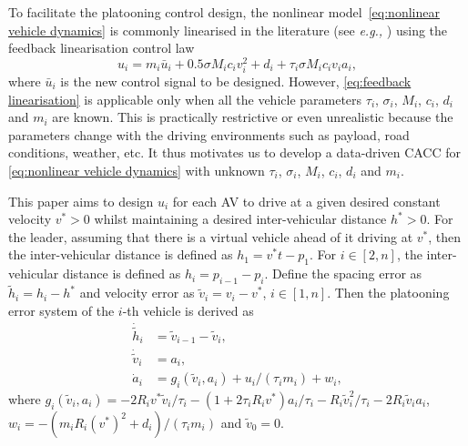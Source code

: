 \documentclass[letterpaper, 10 pt, conference]{ieeeconf}
\begin{document}
	To facilitate the platooning control design, the nonlinear 
	model~\eqref{eq:nonlinear vehicle dynamics} is commonly linearised in the 
	literature (see \textit{e.g.,} \cite{Ghasemi+13,Hu+20,Shen+22}) using the feedback 
	linearisation control law
	\begin{equation}\label{eq:feedback linearisation}
		u_i = m_i \bar{u}_i + 0.5 \sigma M_i c_i v_i^2 + d_i + \tau_i \sigma M_i c_i 
		v_i a_i,
	\end{equation} 
	where $\bar{u}_i$ is the new control signal to be designed. However, \eqref{eq:feedback linearisation} is 
	applicable only when all the vehicle parameters $\tau_i$, $\sigma_i$, $M_i$, 
	$c_i$, $d_i$ and $m_i$ are known. This is practically restrictive or 
	even unrealistic because the parameters change with the driving environments 
	such as payload, road conditions, weather, etc. It thus motivates us to develop a data-driven CACC for \eqref{eq:nonlinear vehicle dynamics} with unknown
	$\tau_i$, $\sigma_i$, $M_i$, $c_i$, $d_i$ and $m_i$.
	
	This paper aims to design $u_i$ for each AV to drive at a given desired 
	constant velocity $v^* > 0$ whilst maintaining a desired inter-vehicular
	distance $h^* > 0$. For the leader, assuming that there is a virtual vehicle 
	ahead of it driving at $v^*$, then the inter-vehicular distance 
	is defined as $h_1 = v^* t - p_1$. 
	For $i \in [2, n]$, the inter-vehicular distance is defined as $h_i = p_{i-1} - p_i$.  
	Define the spacing error as $\tilde{h}_i = h_i - h^*$ and velocity error 
	as $\tilde{v}_i = v_i - v^*$, $i \in [1,n]$. Then the platooning error system of the 
	$i$-th vehicle is derived as
	\begin{equation}\label{eq:error system 1}
		\begin{split}
			\dot{\tilde{h}}_i &= \tilde{v}_{i-1} - \tilde{v}_i, \\
			\dot{\tilde{v}}_i &= a_i, \\
			\dot{a}_i &= g_i(\tilde{v}_i, a_i) + u_i/(\tau_i m_i)  + w_i,
		\end{split}	 	
	\end{equation} 
	where 
	$g_i(\tilde{v}_i, a_i) 
	= -2R_i v^* \tilde{v}_i/\tau_i  - (1 + 2\tau_i R_i 
	v^*)a_i /\tau_i  - R_i \tilde{v}_i^2/\tau_i  - 2 R_i \tilde{v}_i a_i$,
	$w_i = -(m_i R_i (v^*)^2  + d_i)/(\tau_i m_i)$ and $\tilde{v}_0 = 0$.
	
\end{document}
